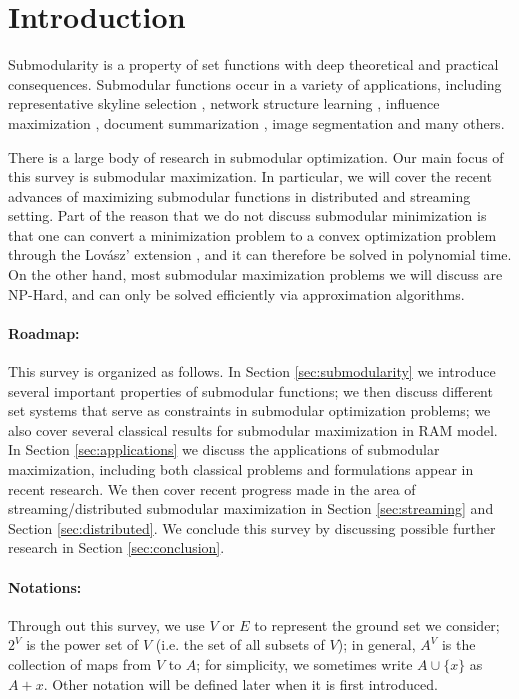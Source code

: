 \section{Introduction}
Submodularity is a property of set functions with deep theoretical and practical consequences. Submodular functions occur in a variety of applications, including representative skyline selection \cite{SLN+11}, network structure learning \cite{GLK10}, influence maximization \cite{KKT03}, document summarization \cite{LB11}, image segmentation \cite{BJM01,KKT09} and many others.


There is a large body of research in submodular optimization. Our main focus of this survey is submodular maximization. In particular, we will cover the recent advances of maximizing submodular functions in distributed and streaming setting. Part of the reason that we do not discuss submodular minimization is that one can convert a minimization problem to a convex optimization problem through the Lov{\'a}sz' extension \cite{L83}, and it can therefore be solved in polynomial time. On the other hand, most submodular maximization problems we will discuss are NP-Hard, and can only be solved efficiently via approximation algorithms.


\paragraph{Roadmap:}
This survey is organized as follows. In Section \ref{sec:submodularity} we introduce several important properties of submodular functions; we then discuss different set systems that serve as constraints in submodular optimization problems; we also cover several classical results for submodular maximization in RAM model. In Section \ref{sec:applications} we discuss the applications of submodular maximization, including both classical problems and formulations appear in recent research. We then cover recent progress made in the area of streaming/distributed submodular maximization in Section \ref{sec:streaming} and Section \ref{sec:distributed}.  We conclude this survey by discussing possible further research in Section \ref{sec:conclusion}.






\paragraph{Notations:}
Through out this survey, we use $V$ or $E$ to represent the ground set we consider; $2^V$ is the power set of $V$ (i.e. the set of all subsets of $V$); in general, $A^V$ is the collection of maps from $V$ to $A$; for simplicity, we sometimes write $A \cup \{x\}$ as $A + x$. Other notation will be defined later when it is first introduced.
